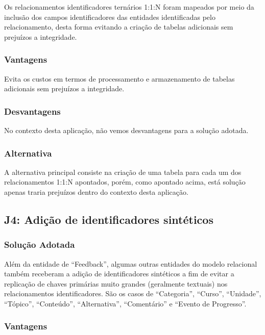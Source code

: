 Os relacionamentos identificadores ternários 1:1:N foram mapeados por meio da
inclusão dos campos identificadores das entidades identificadas pelo
relacionamento, desta forma evitando a criação de tabelas adicionais sem
prejuízos a integridade.

\subsubsection{Vantagens}

Evita os custos em termos de processamento e armazenamento de tabelas
adicionais sem prejuízos a integridade.

\subsubsection{Desvantagens}

No contexto desta aplicação, não vemos desvantagens para a solução adotada.

\subsubsection{Alternativa}

A alternativa principal consiste na criação de uma tabela para cada um dos
relacionamentos 1:1:N apontados, porém, como apontado acima, está solução
apenas traria prejuízos dentro do contexto desta aplicação.

\subsection{\textbf{J4:} Adição de identificadores sintéticos}

\subsubsection{Solução Adotada}

Além da entidade de ``Feedback'', algumas outras entidades do modelo relacional
também receberam a adição de identificadores sintéticos a fim de evitar a
replicação de chaves primárias muito grandes (geralmente textuais) nos
relacionamentos identificadores. São os casos de ``Categoria'', ``Curso'',
``Unidade'', ``Tópico'', ``Conteúdo'', ``Alternativa'', ``Comentário'' e
``Evento de Progresso''.

\subsubsection{Vantagens}

